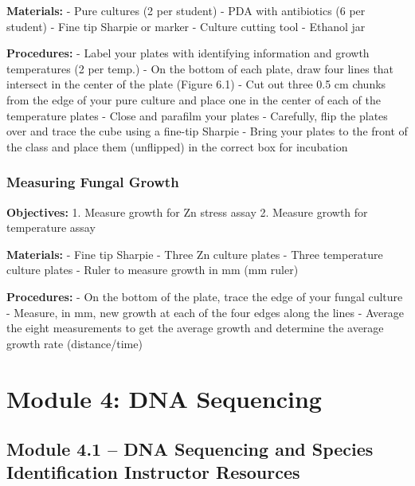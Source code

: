\documentclass[
  letterpaper,
  DIV=11,
  numbers=noendperiod]{scrreprt}
\begin{document}
\textbf{Materials:} - Pure cultures (2 per student) - PDA with
antibiotics (6 per student) - Fine tip Sharpie or marker - Culture
cutting tool - Ethanol jar

\textbf{Procedures:} - Label your plates with identifying information
and growth temperatures (2 per temp.) - On the bottom of each plate,
draw four lines that intersect in the center of the plate (Figure 6.1) -
Cut out three 0.5 cm chunks from the edge of your pure culture and place
one in the center of each of the temperature plates - Close and parafilm
your plates - Carefully, flip the plates over and trace the cube using a
fine-tip Sharpie - Bring your plates to the front of the class and place
them (unflipped) in the correct box for incubation

\subsection*{Measuring Fungal Growth}\label{measuring-fungal-growth}

\textbf{Objectives:} 1. Measure growth for Zn stress assay 2. Measure
growth for temperature assay

\textbf{Materials:} - Fine tip Sharpie - Three Zn culture plates - Three
temperature culture plates - Ruler to measure growth in mm (mm ruler)

\textbf{Procedures:} - On the bottom of the plate, trace the edge of
your fungal culture - Measure, in mm, new growth at each of the four
edges along the lines - Average the eight measurements to get the
average growth and determine the average growth rate (distance/time)


\chapter*{Module 4: DNA Sequencing}\label{module-4-dna-sequencing}


\section*{Module 4.1 -- DNA Sequencing and Species Identification
Instructor
Resources}\label{module-4.1-dna-sequencing-and-species-identification-instructor-resources}
\end{document}

